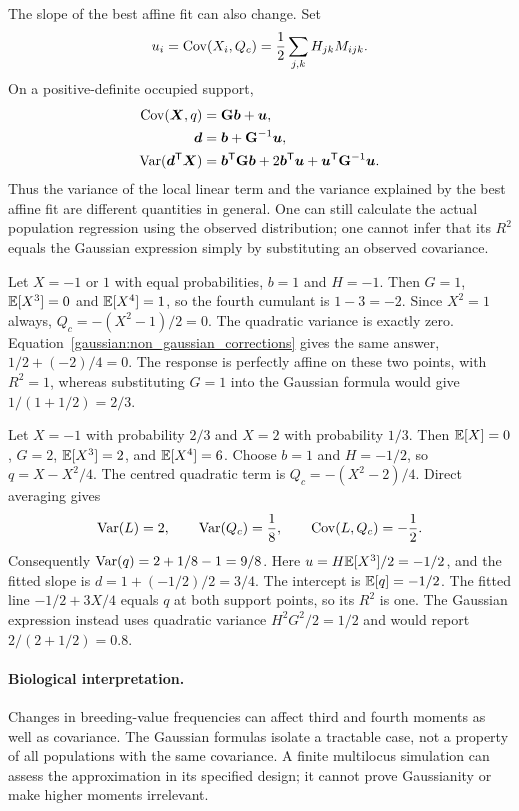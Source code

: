 The slope of the best affine fit can also change. Set
\begin{equation}
u_i=\operatorname{Cov}(X_i,Q_c)=\frac12\sum_{j,k}H_{jk}M_{ijk}.
\end{equation}
On a positive-definite occupied support,
\begin{align}
\operatorname{Cov}(\boldsymbol{X},q)&=\mathbf{G}\boldsymbol{b}+\boldsymbol{u},\nonumber\\
\boldsymbol{d}&=\boldsymbol{b}+\mathbf{G}^{-1}\boldsymbol{u},\nonumber\\
\operatorname{Var}(\boldsymbol{d}^{\mathsf T}\boldsymbol{X})
 &=\boldsymbol{b}^{\mathsf T}\mathbf{G}\boldsymbol{b}
   +2\boldsymbol{b}^{\mathsf T}\boldsymbol{u}
   +\boldsymbol{u}^{\mathsf T}\mathbf{G}^{-1}\boldsymbol{u}.
\label{gaussian:non_gaussian_projection}
\end{align}
Thus the variance of the local linear term and the variance explained by
the best affine fit are different quantities in general. One can still
calculate the actual population regression using the observed
distribution; one cannot infer that its $R^2$ equals the Gaussian
expression simply by substituting an observed covariance.

\begin{example}
Let $X=-1$ or $1$ with equal probabilities, $b=1$ and $H=-1$. Then
$G=1$, $\mathbb E[X^3]=0$ and $\mathbb E[X^4]=1$, so the fourth cumulant is
$1-3=-2$. Since $X^2=1$ always, $Q_c=-(X^2-1)/2=0$. The quadratic
variance is exactly zero. Equation~\eqref{gaussian:non_gaussian_corrections}
gives the same answer, $1/2+(-2)/4=0$. The response is perfectly affine
on these two points, with $R^2=1$, whereas substituting $G=1$ into the
Gaussian formula would give $1/(1+1/2)=2/3$.
\end{example}

\begin{example}
Let $X=-1$ with probability $2/3$ and $X=2$ with probability $1/3$.
Then $\mathbb E[X]=0$, $G=2$, $\mathbb E[X^3]=2$, and $\mathbb E[X^4]=6$.
Choose $b=1$ and $H=-1/2$, so $q=X-X^2/4$. The centred quadratic term
is $Q_c=-(X^2-2)/4$. Direct averaging gives
\[
\operatorname{Var}(L)=2,\qquad \operatorname{Var}(Q_c)=\frac18,\qquad
\operatorname{Cov}(L,Q_c)=-\frac12.
\]
Consequently $\operatorname{Var}(q)=2+1/8-1=9/8$. Here
$u=H\mathbb E[X^3]/2=-1/2$, and the fitted slope is
$d=1+(-1/2)/2=3/4$. The intercept is $\mathbb E[q]=-1/2$.
The fitted line $-1/2+3X/4$ equals $q$ at both support points, so its
$R^2$ is one. The Gaussian expression instead uses quadratic variance
$H^2G^2/2=1/2$ and would report $2/(2+1/2)=0.8$.
\end{example}

\paragraph{Biological interpretation.}
Changes in breeding-value frequencies can affect third and fourth moments
as well as covariance. The Gaussian formulas isolate a tractable case,
not a property of all populations with the same covariance. A finite
multilocus simulation can assess the approximation in its specified
design; it cannot prove Gaussianity or make higher moments irrelevant.

